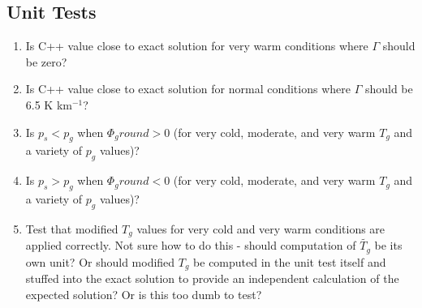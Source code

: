 \subsection{Unit Tests}

\begin{enumerate}
\item Is C++ value close to exact solution for very warm conditions where $\Gamma$ should be zero? 
\item Is C++ value close to exact solution for normal conditions where $\Gamma$ should be 6.5 K km$^{-1}$?
\item Is $p_s<p_g$ when $\Phi_ground>0$ (for very cold, moderate, and very warm $T_g$ and a variety of $p_g$ values)?
\item Is $p_s>p_g$ when $\Phi_ground<0$ (for very cold, moderate, and very warm $T_g$ and a variety of $p_g$ values)?
\item Test that modified $T_g$ values for very cold and very warm conditions are applied correctly. Not sure how to do this - should computation of $\widetilde{T_g}$ be its own unit? Or should modified $T_g$ be computed in the unit test itself and stuffed into the exact solution to provide an independent calculation of the expected solution? Or is this too dumb to test?
\end{enumerate}




